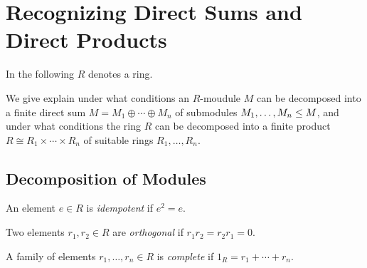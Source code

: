 \section{Recognizing Direct Sums and Direct Products}


\begin{conventions}
  In the following $R$ denotes a ring.
\end{conventions}


\begin{fluff}
  We give explain under what conditions an $R$-moudule $M$ can be decomposed into a finite direct sum $M = M_1 \oplus \dotsb \oplus M_n$ of submodules $M_1, \dotsc, M_n \leq M$, and under what conditions the ring $R$ can be decomposed into a finite product $R \cong R_1 \times \dotsb \times R_n$ of suitable rings $R_1, \dotsc, R_n$.
\end{fluff}





\subsection{Decomposition of Modules}


\begin{definition}
  An element $e \in R$ is \emph{idempotent} if $e^2 = e$.
\end{definition}


\begin{definition}
  Two elements $r_1, r_2 \in R$ are \emph{orthogonal} if $r_1 r_2 = r_2 r_1 = 0$.
\end{definition}


\begin{definition}
  A family of elements $r_1, \dotsc, r_n \in R$ is \emph{complete} if $1_R = r_1 + \dotsb + r_n$.
\end{definition}


